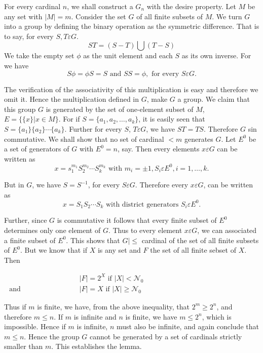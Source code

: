 \begin{proof of lemma}
  For every cardinal $n$, we shall construct a $G_n$ with the desire
  property. Let $M$ be any set with $|M|=m$. Consider the set $G$ of
  all finite subsets of $M$. We turn $G$ into a group by defining the
  binary operation as the symmetric difference. That is to say, for
  every $S,T \varepsilon G$. 
  $$
  ST=(S-T)\bigcup (T-S)
  $$
  We take the empty set $\phi$ as the unit element and each $S$ as its
  own inverse. For we have 
  $$
  S \phi=\phi S=S \text{ and }SS=\phi, \text{ for every } S \varepsilon G.
  $$

  The verification of the associativity of this multiplication is easy
  and therefore we omit it. Hence the multiplication defined in $G$,
  make $G$ a group. We  claim that this group $G$ is generated by the
  set of one-element subset of $M$, $E= \bigg \{ \{ x\} \bigg | x \in
  M \bigg \}$. For if $S=\bigg \{ a_1,a_2, \ldots, a_k \bigg \}$, it
  is easily seen that $S=\{ a_1\} \{ a_2\} \cdots \{ a_k \}$. Further
  for every $S$, $T \varepsilon G$, we have $ST=TS$. Therefore $G$ sin
  commutative. We shall show that no set of cardinal $<m$ generates
  $G$. Let $E^0$ be a set of generators of $G$ with $E^0=n$, say. Then
  every elements $x \varepsilon G$ can be written as 
  $$
  x=s^{m_1}_1 S^{m_2}_2 \cdots S^{m_k}_k \text{ with } m_i=\pm1, S_i
  \varepsilon E^0, i=1,\ldots, k. 
  $$

  But in $G$, we have $S=S^{-1}$, for every $S \varepsilon
  G$. Therefore every $x \varepsilon G$, can be written as 
  $$
  x=S_1S_2 \cdots S_k \text{ with district generators } S_i \varepsilon E^0.
  $$
  
  Further, since $G$ is commutative it follows that every finite
  subset of $E^0$ determines only one element of $G$. Thus to every
  element $x \varepsilon G$, we can associated a finite subset of
  $E^0$. This shows that $G|\leq$ cardinal of the set of all finite
  subsets of $E^0$. But we know that if $X$ is any set and $F$ the set
  of all finite sebset of $X$. Then 

\noindent $\begin{aligned}
    & |F|= 2^X \text{ if }|X|< \mathcal{N}_0\\
    \text{ and } \hspace{3cm} &|F|= X \text{ if }|X|\geq \mathcal{N}_0
  \end{aligned}
$

  Thus if $m$ is finite, we have, from the above inequality, that $2^m
  \geq 2^n$, and therefore $m \leq n$. If $m$ is infinite and $n$ is
  finite, we have $m \leq 2^n$, which is impossible. Hence if $m$ is
  infinite, $n$ must also be infinite, and again conclude that $m \leq
  n$. Hence the group $G$ cannot be generated by a set of cardinals
  strictly smaller than $m$. This establishes the lemma. 
\end{proof of lemma}


